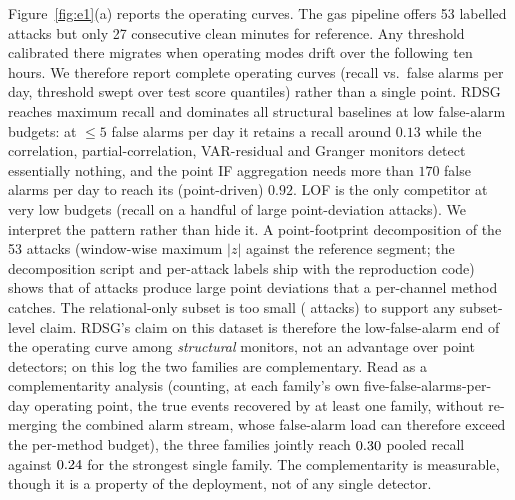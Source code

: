 \documentclass[11pt,a4paper]{article}
\newcommand{\RDSG}{RDSG}
\begin{document}
Figure~\ref{fig:e1}(a) reports the operating curves. The gas pipeline offers 53 labelled attacks but only 27 consecutive clean
minutes for reference. Any threshold calibrated there migrates when operating
modes drift over the following ten hours. We therefore report complete
operating curves (recall vs.\ false alarms per day, threshold swept over test
score quantiles) rather than a single point. \RDSG{} reaches
\eOneOursMaxRecall{} maximum recall and dominates all structural baselines at
low false-alarm budgets: at $\le 5$ false alarms per day it retains
a recall around $0.13$ while the correlation, partial-correlation,
VAR-residual and Granger monitors detect essentially nothing, and the point
IF aggregation needs more than $170$ false alarms per day to reach its
(point-driven) $0.92$. LOF is the only competitor at very low budgets (recall
\eOneLofRecallLowFa{} on a handful of large point-deviation attacks). We
interpret the pattern rather than hide it. A point-footprint decomposition
of the 53 attacks (window-wise maximum $|z|$ against the reference segment;
the decomposition script and per-attack labels ship with the reproduction
code) shows that \eOneCVis{} of \eOneCTotal{} attacks produce large point deviations that a
per-channel method catches. The relational-only subset is too small (\eOneCRel{}
attacks) to support any subset-level claim. \RDSG{}'s claim on this dataset
is therefore the low-false-alarm end of the operating curve among
\emph{structural} monitors, not an advantage over point detectors; on this
log the two families are complementary. Read as a complementarity analysis (counting, at each family's own
five-false-alarms-per-day operating point, the true events recovered by at
least one family, without re-merging the combined alarm stream, whose
false-alarm load can therefore exceed the per-method budget), the three
families jointly reach $0.30{}$ pooled recall against $0.24{}$ for the strongest single family. The complementarity is measurable, though it is a property
of the deployment, not of any single detector.
\end{document}
